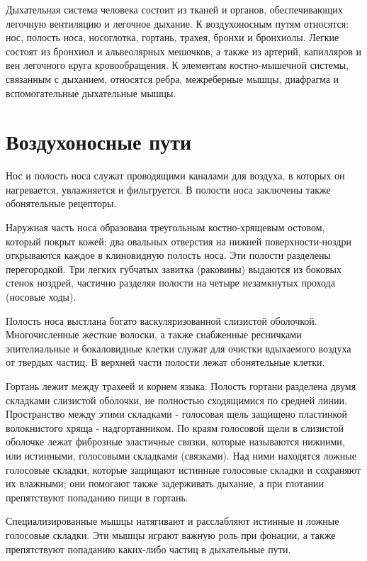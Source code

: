 \documentclass[a4paper,14pt]{extreport}
\begin{document}
Дыхательная  система   человека  состоит  из  тканей  и  органов,  обеспечивающих  легочную вентиляцию  и  легочное  дыхание.  К воздухоносным путям относятся: нос, полость носа, носоглотка, гортань, трахея, бронхи и бронхиолы. Легкие состоят из бронхиол и альвеолярных мешочков, а также из артерий, капилляров и вен легочного круга кровообращения. К элементам костно-мышечной системы, связанным с дыханием, относятся ребра, межреберные мышцы, диафрагма и вспомогательные дыхательные мышцы.

\section{Воздухоносные пути}
Нос и полость носа служат проводящими каналами для воздуха, в которых он нагревается, увлажняется и фильтруется.  В полости носа заключены также обонятельные  рецепторы.

Наружная  часть  носа  образована  треугольным  костно-хрящевым остовом, который покрыт кожей; два овальных  отверстия на нижней поверхности-ноздри открываются каждое в клиновидную полость носа. Эти полости разделены перегородкой. 
Три легких губчатых завитка (раковины) выдаются из боковых стенок ноздрей, частично разделяя полости на четыре  незамкнутых прохода (носовые ходы).

Полость носа выстлана  богато васкуляризованной слизистой оболочкой. Многочисленные жесткие волоски,  а также снабженные  ресничками эпителиальные и бокаловидные клетки служат для  очистки вдыхаемого воздуха от твердых частиц. В верхней части полости  лежат  обонятельные  клетки.  

Гортань  лежит  между  трахеей  и  корнем  языка.  Полость  гортани  разделена  двумя  складками  слизистой  оболочки,  не  полностью  сходящимися  по  средней  линии.  Пространство  между  этими складками - голосовая  щель  защищено  пластинкой  волокнистого  хряща  -  надгортанником. По краям голосовой щели в слизистой оболочке лежат фиброзные эластичные связки, которые называются нижними, или истинными, голосовыми складками (связками). Над ними находятся ложные голосовые складки,  которые защищают истинные  голосовые складки и сохраняют их влажными; они помогают также задерживать дыхание, а при глотании препятствуют попаданию пищи  в гортань. 

Специализированные мышцы натягивают и расслабляют истинные и ложные голосовые складки. Эти мышцы играют важную роль при фонации, а также препятствуют попаданию каких-либо частиц в дыхательные пути.
\end{document}
